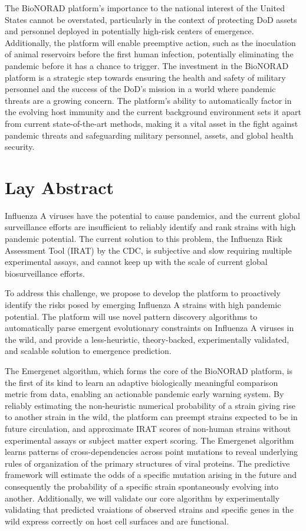 \documentclass[onecolumn, compsoc,12pt]{IEEEtran}
\begin{document}
The BioNORAD platform's importance to the national interest of the United States cannot be overstated, particularly in the context of protecting DoD assets and personnel deployed in potentially high-risk centers of emergence. Additionally, the platform will enable preemptive action, such as the inoculation of animal reservoirs before the first human infection, potentially eliminating the pandemic before it has a chance to trigger. The investment in the BioNORAD platform is a strategic step towards ensuring the health and safety of military personnel and the success of the DoD's mission in a world where pandemic threats are a growing concern.  The platform's ability to automatically factor in the evolving host immunity and the current background environment sets it apart from current state-of-the-art methods, making it a vital asset in the fight against pandemic threats and safeguarding military personnel, assets, and global health security.

\clearpage

\section*{Lay Abstract}

Influenza A viruses have the potential to cause pandemics, and the current global surveillance efforts are insufficient to reliably identify and rank strains with high pandemic potential. The current solution to this problem, the Influenza Risk Assessment Tool (IRAT) by the CDC, is subjective and slow requiring multiple experimental assays,  and cannot keep up with the scale of current global biosurveillance efforts.

To address this challenge, we propose to develop the \bnd  platform to proactively identify the risks posed by emerging Influenza A strains with high pandemic potential. The platform will use novel pattern discovery algorithms to automatically parse emergent evolutionary constraints on Influenza A viruses in the wild, and provide a less-heuristic, theory-backed, experimentally validated, and scalable solution to emergence prediction.

The Emergenet algorithm, which forms the core of the BioNORAD platform, is the first of its kind to learn an adaptive  biologically meaningful comparison metric from data, enabling an actionable pandemic early warning system. By reliably estimating the non-heuristic numerical probability of a strain giving rise to another strain in the wild, the platform can preempt strains expected to be in future circulation, and approximate IRAT scores of non-human strains without experimental assays or subject matter expert scoring. The Emergenet algorithm learns patterns of cross-dependencies across point mutations to reveal underlying rules of organization of the primary structures of viral proteins. The predictive framework will estimate the odds of a specific mutation arising in the future and consequently the probability of a specific strain spontaneously evolving into another. Additionally, we will validate our core algorithm by experimentally validating that predicted vraiations of observed strains and specific genes in the wild express correctly on host cell surfaces and are functional.
\end{document}
